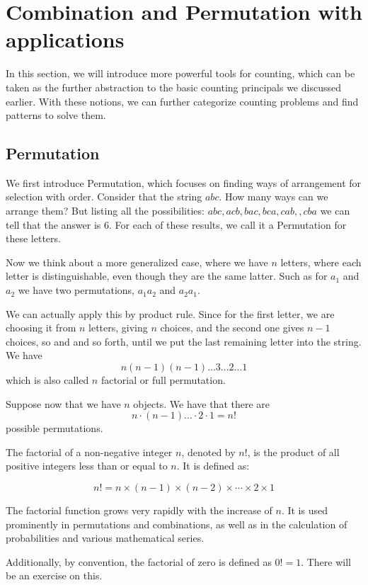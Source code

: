     \section{Combination and Permutation with applications}
    In this section, we will introduce more powerful tools for counting, which
    can be taken as the further abstraction to the basic counting principals we discussed
    earlier. With these notions, we can further categorize counting problems and find
    patterns to solve them.
        \subsection{Permutation}
        We first introduce Permutation, which focuses on finding ways of arrangement
        for selection with order. Consider that the string $abc$. How many ways can we 
        arrange them? But listing all the possibilities: $abc, acb, bac, bca, cab,
        ,cba$ we can tell that the answer is 6. For each of these results, we call it 
        a Permutation for these letters.

        Now we think about a more generalized case, where we have $n$ letters, where 
        each letter is distinguishable, even though they are the same latter. Such as 
        for $a_1$ and $a_2$ we have two permutations, $a_1a_2$ and $a_2a_1$.
    
        We can actually apply this by product rule. Since for the first letter, we 
        are choosing it from $n$ letters, giving $n$ choices, and the second one gives
        $n-1$ choices, so and and so forth, until we put the last remaining letter into
        the string. We have 
        $$n(n-1)(n-1)\dots 3\dots 2 \dots 1$$
        which is also called $n$ factorial or full permutation.
        \begin{definition}\label{FP}
            Suppose now that we have $n$ objects. We have that there are $$n\cdot (n-1)\dots \cdot2 \cdot 1 = n!$$
            possible permutations.
        \end{definition}

        \begin{notation}[Factorial($!$)]
            The factorial of a non-negative integer \( n \), denoted by \( n! \), is the product of all positive integers less than or equal to \( n \). It is defined as:

            $$
            n! = n \times (n-1) \times (n-2) \times \cdots \times 2 \times 1
            $$

            The factorial function grows very rapidly with the increase of \( n \). It is used prominently in permutations and combinations, as well as in the calculation of probabilities and various mathematical series.
            
            Additionally, by convention, the factorial of zero is defined as \( 0! = 1 \).
            There will be an exercise on this.
        \end{notation}

